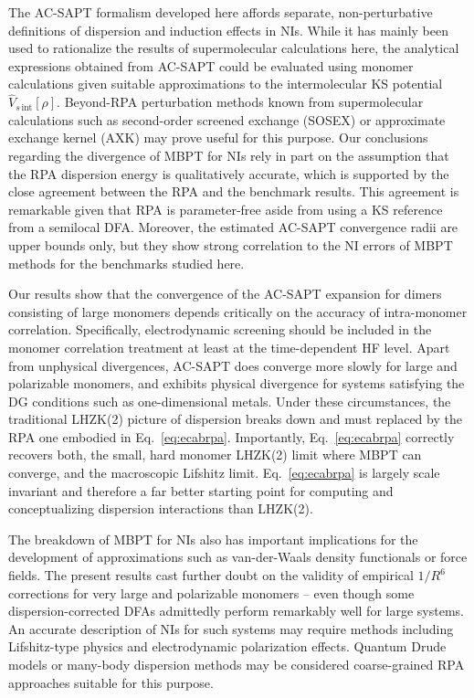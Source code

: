 \documentclass[journal=jctcce,manuscript=article]{achemso}
\begin{document}
The AC-SAPT formalism developed here affords separate, non-perturbative
definitions of dispersion and induction effects in NIs. While it has
mainly been used to rationalize the results of supermolecular
calculations here, the analytical expressions obtained from AC-SAPT
could be evaluated using monomer calculations given suitable
approximations to the intermolecular KS potential
$\hat{V}_{s\,\text{int}}[\rho]$. Beyond-RPA perturbation
methods known from supermolecular calculations such as
second-order screened exchange
(SOSEX)\cite{doi:10.1063/1.3250347,doi:10.1063/1.3317437,doi:10.1063/1.3501928,
doi:10.1063/1.5025938}
or approximate exchange kernel (AXK)\cite{Bates13JChemPhys139p171103,doi:10.1021/acs.jctc.8b00777}
may prove useful for this purpose. Our
conclusions regarding the divergence of MBPT for NIs rely in part on the
assumption that the RPA dispersion energy is qualitatively accurate, which is
supported by the close agreement between the RPA and the benchmark results.
This agreement is remarkable given that RPA is parameter-free aside from
using a KS reference from a semilocal DFA. Moreover, the estimated
AC-SAPT convergence radii are upper bounds only, but they show strong
correlation to the NI errors of MBPT methods for the benchmarks studied
here.

Our results show that the convergence of the AC-SAPT expansion for
dimers consisting of large monomers depends critically on the accuracy
of intra-monomer correlation. Specifically, electrodynamic 
screening should be included in the monomer correlation treatment at
least at the time-dependent HF level. Apart from unphysical
divergences, AC-SAPT does converge more slowly for large and polarizable
monomers, and exhibits physical divergence for systems satisfying
the DG conditions such as one-dimensional metals. Under these circumstances,
the traditional  LHZK(2) picture of dispersion breaks down and must
replaced by the RPA one embodied in Eq.~\eqref{eq:ecabrpa}. Importantly,
Eq.~\eqref{eq:ecabrpa} correctly recovers both, the small, hard
monomer LHZK(2) limit where MBPT can converge, and the
macroscopic Lifshitz limit. Eq.~\eqref{eq:ecabrpa} is largely scale
invariant and therefore a far better starting point for computing
and conceptualizing dispersion interactions than LHZK(2).

The breakdown of MBPT for NIs also has important implications for the
development of approximations such as van-der-Waals density functionals
or force fields. The present results cast further doubt on the validity of
empirical $1/R^6$ corrections for very large and polarizable monomers --
even though some dispersion-corrected DFAs admittedly perform remarkably
well for large systems.
An accurate description of NIs for such systems may require methods including
Lifshitz-type physics and electrodynamic polarization effects. Quantum
Drude models\cite{PhysRevB.87.144103} or many-body dispersion
methods\cite{Tkatchenko12PhysRevLett108p236402,doi:10.1021/acs.chemrev.6b00446}
may be considered coarse-grained RPA approaches suitable for this purpose. 
\end{document}
